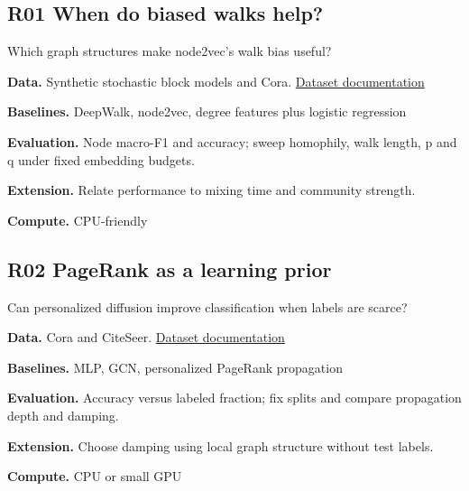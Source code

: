\documentclass[11pt,letterpaper]{article}
\begin{document}
\begin{minipage}{\linewidth}\subsection*{R01 When do biased walks help?}
Which graph structures make node2vec's walk bias useful?\par\textbf{Data.} Synthetic stochastic block models and Cora. \href{https://pytorch-geometric.readthedocs.io/en/latest/generated/torch_geometric.datasets.Planetoid.html}{Dataset documentation}\par
\textbf{Baselines.} DeepWalk, node2vec, degree features plus logistic regression\par
\textbf{Evaluation.} Node macro-F1 and accuracy; sweep homophily, walk length, p and q under fixed embedding budgets.\par
\textbf{Extension.} Relate performance to mixing time and community strength.\par
\textbf{Compute.} CPU-friendly\par
\end{minipage}\par\vspace{8pt}
\begin{minipage}{\linewidth}\subsection*{R02 PageRank as a learning prior}
Can personalized diffusion improve classification when labels are scarce?\par\textbf{Data.} Cora and CiteSeer. \href{https://pytorch-geometric.readthedocs.io/en/latest/generated/torch_geometric.datasets.Planetoid.html}{Dataset documentation}\par
\textbf{Baselines.} MLP, GCN, personalized PageRank propagation\par
\textbf{Evaluation.} Accuracy versus labeled fraction; fix splits and compare propagation depth and damping.\par
\textbf{Extension.} Choose damping using local graph structure without test labels.\par
\textbf{Compute.} CPU or small GPU\par
\end{minipage}\par\vspace{8pt}
\end{document}
